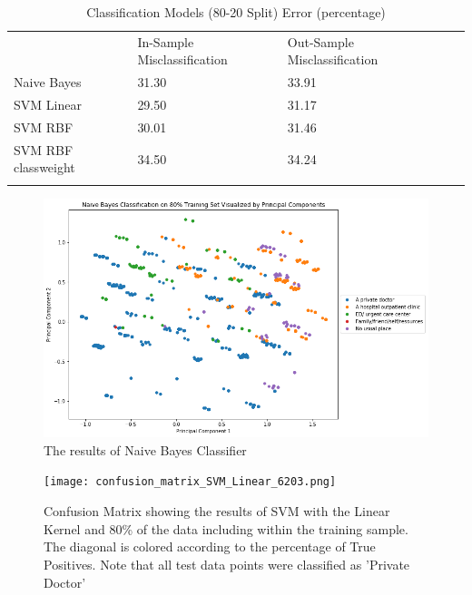 \documentclass[10pt,twocolumn]{article}
\begin{document}
\begin{center}
\begin{table}[]
\centering
\caption{Classification Models (80-20 Split) Error (percentage)}
\label{my-label}
\begin{tabular}{lllll}
                & In-Sample Misclassification & Out-Sample Misclassification & \\
Naive Bayes        & 31.30              & 33.91                  & \\
SVM Linear    & 29.50              & 31.17               & \\
SVM RBF      & 30.01               & 31.46                & \\
SVM RBF classweight       & 34.50               & 34.24                  & \\
                &                           &                         &
\end{tabular}
\end{table}
\end{center}

\begin{figure}[!t]
  \begin{center}
    \includegraphics[width=6in]{PCA_NaiveBayes.png}
  \end{center}

  \caption{\small The results of Naive Bayes Classifier}
  \label{fig-1}
\end{figure}

\begin{figure}[!t]
  \begin{center}
    \texttt{[image: confusion\_matrix\_SVM\_Linear\_6203.png]}
  \end{center}

  \caption{\small Confusion Matrix showing the results of SVM with the Linear Kernel and
  80\% of the data including within the training sample. The diagonal is colored according to
  the percentage of True Positives. Note that all test data points were classified
  as 'Private Doctor'}
  \label{fig-2}
\end{figure}
\end{document}
